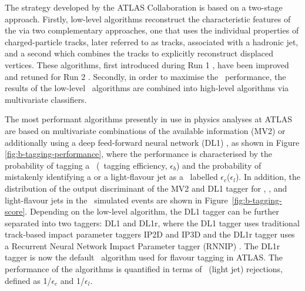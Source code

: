 \documentclass[letterpaper,12pt]{article}
\begin{document}
The strategy developed by the ATLAS Collaboration is based on a two-stage approach. 
Firstly, low-level algorithms reconstruct the characteristic features of 
the \bjets via two complementary approaches, one that uses the 
individual properties of charged-particle tracks, later referred 
to as tracks, associated with a hadronic jet, and a second which 
combines the tracks to explicitly reconstruct displaced vertices. 
These algorithms, first introduced during Run 1 \cite{PERF-2012-04}, 
have been improved and retuned for Run 2 \cite{FTAG-2018-01}. 
Secondly, in order to 
maximise the \btagging\ performance, the results of the low-level 
\btagging\ algorithms are combined into high-level algorithms 
via multivariate classifiers. 


The most performant algorithms presently in use in physics 
analyses at ATLAS are based on multivariate combinations 
of the available information (MV2) or additionally using a
deep feed-forward neural network (DL1) \cite{tagging,ATL-PHYS-PUB-2017-013}, 
as shown in Figure \ref{fig:b-tagging-performance}, where the performance
is characterised by the probability of 
tagging a \bjet\ (\bjet\ tagging efficiency, 
$\epsilon_b$) and the probability of mistakenly identifying 
a \cjet or a light-flavour jet as a \bjet\, 
labelled $\epsilon_c$($\epsilon_l$). 
In addition, the distribution of the output discriminant
of the MV2 and DL1 tagger for \bjet, \cjet, and light-flavour jets
in the \ttbar\ simulated events are shown in Figure~\ref{fig:b-tagging-score}.
Depending on the low-level algorithm, 
the DL1 tagger can be further separated into two taggers: DL1 and DL1r,
 where the DL1 tagger uses traditional track-based impact parameter 
 taggers IP2D and IP3D \cite{ATL-PHYS-PUB-2016-012} 
 and the DL1r tagger uses a Recurrent Neural Network Impact Parameter tagger 
 (RNNIP) \cite{ATL-PHYS-PUB-2017-013}. The DL1r tagger is now the 
 default \btagging\ algorithm used for flavour tagging in ATLAS.
 The performance of the algorithms is quantified 
in terms of \cjet\ (light jet) rejections, defined as 
1/$\epsilon_c$ and 1/$\epsilon_l$. 
\end{document}
